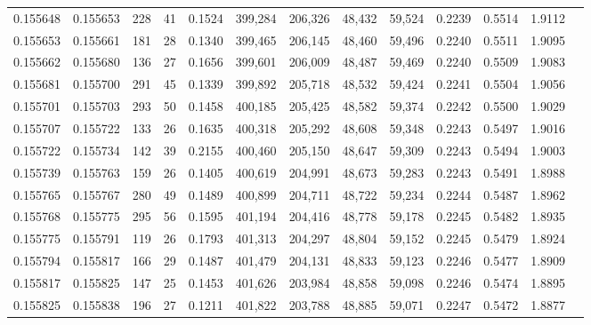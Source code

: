 \begin{tabular}{rrrrrrrrrrrrr}
0.155648 & 0.155653 &   228 &  41 &                                     0.1524 & 399,284 & 206,326 &  48,432 &  59,524 & 0.2239 & 0.5514 & 1.9112 \\
0.155653 & 0.155661 &   181 &  28 &                                     0.1340 & 399,465 & 206,145 &  48,460 &  59,496 & 0.2240 & 0.5511 & 1.9095 \\
0.155662 & 0.155680 &   136 &  27 &                                     0.1656 & 399,601 & 206,009 &  48,487 &  59,469 & 0.2240 & 0.5509 & 1.9083 \\
0.155681 & 0.155700 &   291 &  45 &                                     0.1339 & 399,892 & 205,718 &  48,532 &  59,424 & 0.2241 & 0.5504 & 1.9056 \\
0.155701 & 0.155703 &   293 &  50 &                                     0.1458 & 400,185 & 205,425 &  48,582 &  59,374 & 0.2242 & 0.5500 & 1.9029 \\
0.155707 & 0.155722 &   133 &  26 &                                     0.1635 & 400,318 & 205,292 &  48,608 &  59,348 & 0.2243 & 0.5497 & 1.9016 \\
0.155722 & 0.155734 &   142 &  39 &                                     0.2155 & 400,460 & 205,150 &  48,647 &  59,309 & 0.2243 & 0.5494 & 1.9003 \\
0.155739 & 0.155763 &   159 &  26 &                                     0.1405 & 400,619 & 204,991 &  48,673 &  59,283 & 0.2243 & 0.5491 & 1.8988 \\
0.155765 & 0.155767 &   280 &  49 &                                     0.1489 & 400,899 & 204,711 &  48,722 &  59,234 & 0.2244 & 0.5487 & 1.8962 \\
0.155768 & 0.155775 &   295 &  56 &                                     0.1595 & 401,194 & 204,416 &  48,778 &  59,178 & 0.2245 & 0.5482 & 1.8935 \\
0.155775 & 0.155791 &   119 &  26 &                                     0.1793 & 401,313 & 204,297 &  48,804 &  59,152 & 0.2245 & 0.5479 & 1.8924 \\
0.155794 & 0.155817 &   166 &  29 &                                     0.1487 & 401,479 & 204,131 &  48,833 &  59,123 & 0.2246 & 0.5477 & 1.8909 \\
0.155817 & 0.155825 &   147 &  25 &                                     0.1453 & 401,626 & 203,984 &  48,858 &  59,098 & 0.2246 & 0.5474 & 1.8895 \\
0.155825 & 0.155838 &   196 &  27 &                                     0.1211 & 401,822 & 203,788 &  48,885 &  59,071 & 0.2247 & 0.5472 & 1.8877 \\

\end{tabular}
